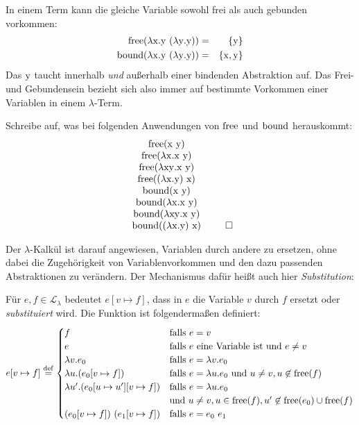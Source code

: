 In einem Term kann die gleiche Variable sowohl frei als auch gebunden
vorkommen:
%
\begin{eqnarray*}
  \operatorname{free}(\lambda \mathrm x.\mathrm y~(\lambda \mathrm y.\mathrm y)) &=& \{ \mathrm y\} \\
  \operatorname{bound}(\lambda \mathrm x.\mathrm y~(\lambda \mathrm y.\mathrm y)) &=& \{ \mathrm x,
                                                            \mathrm y\}
\end{eqnarray*}
%
Das $\mathrm y$ taucht innerhalb \emph{und} außerhalb einer bindenden
Abstraktion auf. Das Frei- und Gebundensein bezieht sich also
immer auf bestimmte Vorkommen einer Variablen in
einem $\lambda$-Term.
%
\begin{aufgabe}
  Schreibe auf, was bei folgenden Anwendungen von $\operatorname{free}$ und $\operatorname{bound}$
  herauskommt:
  \begin{displaymath}
    \begin{array}[b]{c}
      \operatorname{free}(\mathrm x~\mathrm y)\\
      \operatorname{free}(\lambda \mathrm x.\mathrm x~\mathrm y)\\
      \operatorname{free}(\lambda \mathrm x\mathrm y.\mathrm x~\mathrm y)\\
      \operatorname{free}((\lambda\mathrm x.\mathrm y)~\mathrm x)\\
      \operatorname{bound}(\mathrm x~\mathrm y)\\
      \operatorname{bound}(\lambda \mathrm x.\mathrm x~\mathrm y)\\
      \operatorname{bound}(\lambda \mathrm x\mathrm y.\mathrm x~\mathrm y)\\
      \operatorname{bound}((\lambda\mathrm x.\mathrm y)~\mathrm x)
    \end{array}\tag*{$\square$}
  \end{displaymath}
\end{aufgabe}
%
Der $\lambda$-Kalkül ist darauf
angewiesen, Variablen durch andere zu ersetzen, ohne dabei die
Zugehörigkeit von Variablenvorkommen und den dazu passenden
Abstraktionen zu verändern.  Der Mechanismus dafür heißt auch hier
\textit{Substitution}:
%
\begin{definition}[Substitution]\label{def:substitution}
  Für $e,f\in \mathcal{L}_{\lambda}$ bedeutet $e[v\mapsto f]$, dass in
  $e$ die Variable $v$ durch $f$
  ersetzt oder \textit{substituiert} wird.  Die Funktion ist
  folgendermaßen definiert:
  \begin{displaymath}
    e[v\mapsto f] \stackrel{\rm def}{=}
    \begin{cases}
      f & \text{falls } e = v\\
      e & \text{falls } e \text{ eine Variable ist und } e \neq v\\
      \lambda v.e_0 & \text{falls } e = \lambda v.e_0\\
      \lambda u.(e_0[v\mapsto f]) & \text{falls } e = \lambda u.e_0 \text{
        und } u\neq v, u\not\in\operatorname{free}(f)\\
      \lambda u'.(e_0[u\mapsto u'][v\mapsto f]) & \text{falls }
      e = \lambda u.e_0 \\ & \text{und }
      u \neq v,u\in\operatorname{free}(f), u'\not\in\operatorname{free}(e_0)\cup\operatorname{free}(f)\\
      (e_0[v\mapsto f])~(e_1[v\mapsto f]) &
      \text{falls } e = e_0~e_1
    \end{cases}
  \end{displaymath}
  \end{definition}
